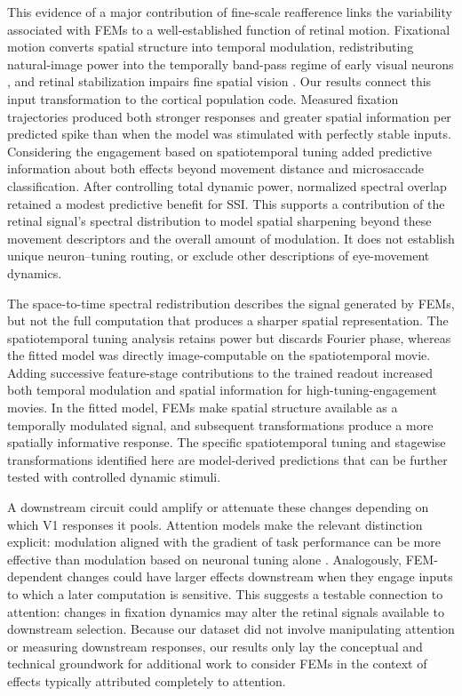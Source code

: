 \documentclass{lite}
\begin{document}
This evidence of a major contribution of fine-scale reafference links the variability associated with FEMs to a well-established function of retinal motion. Fixational motion converts spatial structure into temporal modulation, redistributing natural-image power into the temporally band-pass regime of early visual neurons \cite{rucci2005fixational,kuang2012temporal}, and retinal stabilization impairs fine spatial vision \cite{rucci2007miniature,intoy2020finely}. Our results connect this input transformation to the cortical population code. Measured fixation trajectories produced both stronger responses and greater spatial information per predicted spike than when the model was stimulated with perfectly stable inputs. Considering the engagement based on spatiotemporal tuning added predictive information about both effects beyond movement distance and microsaccade classification. After controlling total dynamic power, normalized spectral overlap retained a modest predictive benefit for SSI. This supports a contribution of the retinal signal's spectral distribution to model spatial sharpening beyond these movement descriptors and the overall amount of modulation. It does not establish unique neuron--tuning routing, or exclude other descriptions of eye-movement dynamics.

The space-to-time spectral redistribution describes the signal generated by FEMs, but not the full computation that produces a sharper spatial representation. The spatiotemporal tuning analysis retains power but discards Fourier phase, whereas the fitted model was directly image-computable on the spatiotemporal movie. Adding successive feature-stage contributions to the trained readout increased both temporal modulation and spatial information for high-tuning-engagement movies. In the fitted model, FEMs make spatial structure available as a temporally modulated signal, and subsequent transformations produce a more spatially informative response. The specific spatiotemporal tuning and stagewise transformations identified here are model-derived predictions that can be further tested with controlled dynamic stimuli.

A downstream circuit could amplify or attenuate these changes depending on which V1 responses it pools. Attention models make the relevant distinction explicit: modulation aligned with the gradient of task performance can be more effective than modulation based on neuronal tuning alone \cite{lindsay2018attention}. Analogously, FEM-dependent changes could have larger effects downstream when they engage inputs to which a later computation is sensitive. This suggests a testable connection to attention: changes in fixation dynamics may alter the retinal signals available to downstream selection. Because our dataset did not involve manipulating attention or measuring downstream responses, our results only lay the conceptual and technical groundwork for additional work to consider FEMs in the context of effects typically attributed completely to attention.
\end{document}
